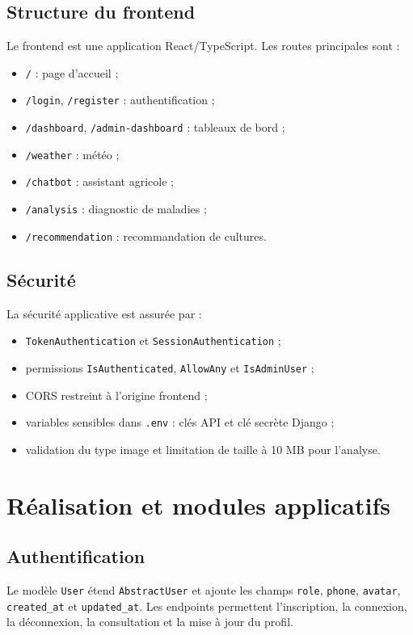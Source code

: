 \documentclass[12pt,a4paper]{report}
\begin{document}
\section{Structure du frontend}
Le frontend est une application React/TypeScript. Les routes principales sont :
\begin{itemize}[noitemsep]
  \item \texttt{/} : page d'accueil ;
  \item \texttt{/login}, \texttt{/register} : authentification ;
  \item \texttt{/dashboard}, \texttt{/admin-dashboard} : tableaux de bord ;
  \item \texttt{/weather} : météo ;
  \item \texttt{/chatbot} : assistant agricole ;
  \item \texttt{/analysis} : diagnostic de maladies ;
  \item \texttt{/recommendation} : recommandation de cultures.
\end{itemize}

\section{Sécurité}
La sécurité applicative est assurée par :
\begin{itemize}[noitemsep]
  \item \texttt{TokenAuthentication} et \texttt{SessionAuthentication} ;
  \item permissions \texttt{IsAuthenticated}, \texttt{AllowAny} et \texttt{IsAdminUser} ;
  \item CORS restreint à l'origine frontend ;
  \item variables sensibles dans \texttt{.env} : clés API et clé secrète Django ;
  \item validation du type image et limitation de taille à 10 MB pour l'analyse.
\end{itemize}

\chapter{Réalisation et modules applicatifs}

\section{Authentification}
Le modèle \texttt{User} étend \texttt{AbstractUser} et ajoute les champs \texttt{role}, \texttt{phone}, \texttt{avatar}, \texttt{created\_at} et \texttt{updated\_at}. Les endpoints permettent l'inscription, la connexion, la déconnexion, la consultation et la mise à jour du profil.
\end{document}
